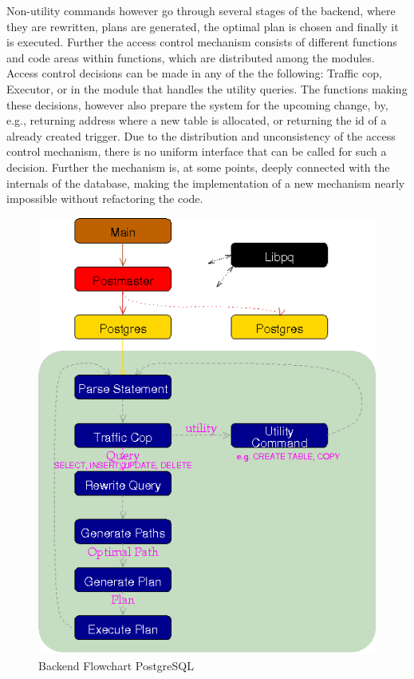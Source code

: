 Non-utility commands however go through several stages of the backend, where they are rewritten, plans are generated, the optimal plan is chosen and finally it is executed.
%
Further the access control mechanism consists of different functions and code areas within functions, which are distributed among the modules.
%
Access control decisions can be made in any of the the following: Traffic cop, Executor, or in the module that handles the utility queries.
%
The functions making these decisions, however also prepare the system for the upcoming change, by, e.g., returning address where a new table is allocated, or returning the id of a already created trigger.
%
Due to the distribution and unconsistency of the access control mechanism, there is no uniform interface that can be called for such a decision.
%
Further the mechanism is, at some points, deeply connected with the internals of the database, making the implementation of a new mechanism nearly impossible without refactoring the code.
%
\begin{figure}[!ht]
  \centering
    \includegraphics[width=1\textwidth]{img/backend_flowchart.png}
    \caption{Backend Flowchart PostgreSQL \protect \footnotemark}\label{figure:postgresql:architecture}
\end{figure}
%
%
\FloatBarrier
%
